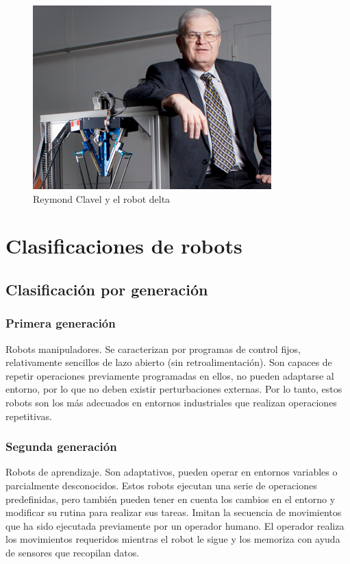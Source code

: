     \begin{figure}[htb]
        \centering
        \includegraphics[width=0.36\linewidth]{Main/Chapter2/Images2/Reymond-Clavel-Robot-Delta.png}
        \caption{Reymond Clavel y el robot delta \cite{cap2_rey}}
        \label{f:Cap2_general_4}
    \end{figure}
    
    
\newpage    
    
\section{Clasificaciones de robots}
    
    \subsection{Clasificación por generación}
        \subsubsection{Primera generación}
            Robots manipuladores. Se caracterizan por programas de control fijos, relativamente sencillos de lazo abierto (sin retroalimentación). Son capaces de repetir operaciones previamente programadas en ellos, no pueden adaptarse al entorno, por lo que no deben existir perturbaciones externas. Por lo tanto, estos robots son los más adecuados en entornos industriales que realizan operaciones repetitivas.
        
        \subsubsection{Segunda generación}
            Robots de aprendizaje. Son adaptativos, pueden operar en entornos variables o parcialmente desconocidos. Estos robots ejecutan una serie de operaciones predefinidas, pero también pueden tener en cuenta los cambios en el entorno y modificar su rutina para realizar sus tareas. Imitan la secuencia de movimientos que ha sido ejecutada previamente por un operador humano. El operador realiza los movimientos requeridos mientras el robot le sigue y los memoriza con ayuda de sensores que recopilan datos.
